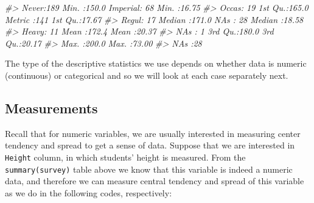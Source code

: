 \documentclass[
]{book}
\newenvironment{Shaded}{\begin{snugshade}}{\end{snugshade}}
\newcommand{\CommentTok}[1]{\textcolor[rgb]{0.56,0.35,0.01}{\textit{#1}}}
\begin{document}
\begin{Shaded}
\begin{Highlighting}[]
\CommentTok{\#\textgreater{}  Never:189   Min.   :150.0   Imperial: 68   Min.   :16.75  }
\CommentTok{\#\textgreater{}  Occas: 19   1st Qu.:165.0   Metric  :141   1st Qu.:17.67  }
\CommentTok{\#\textgreater{}  Regul: 17   Median :171.0   NA\textquotesingle{}s    : 28   Median :18.58  }
\CommentTok{\#\textgreater{}  Heavy: 11   Mean   :172.4                  Mean   :20.37  }
\CommentTok{\#\textgreater{}  NA\textquotesingle{}s :  1   3rd Qu.:180.0                  3rd Qu.:20.17  }
\CommentTok{\#\textgreater{}              Max.   :200.0                  Max.   :73.00  }
\CommentTok{\#\textgreater{}              NA\textquotesingle{}s   :28}
\end{Highlighting}
\end{Shaded}

The type of the descriptive statistics we use depends on whether data is numeric (continuous) or categorical and so we will look at each case separately next.

\hypertarget{measurements}{%
\subsection{Measurements}\label{measurements}}

Recall that for numeric variables, we are usually interested in measuring center tendency and spread to get a sense of data. Suppose that we are interested in \texttt{Height} column, in which students' height is measured. From the \texttt{summary(survey)} table above we know that this variable is indeed a numeric data, and therefore we can measure central tendency and spread of this variable as we do in the following codes, respectively:
\end{document}
